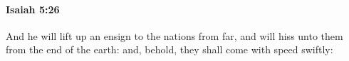
		\paragraph{Isaiah 5:26} %
			\label{ISAIAH-5-26}

			And he will lift up an ensign to the nations from far, and will hiss unto them from the end of the earth: and, behold, they shall come with speed swiftly:


